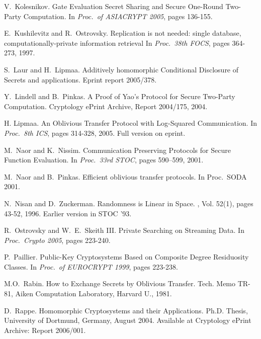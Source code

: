 \documentclass{article}
\begin{document}
\begin{footnotesize}
\begin{thebibliography}{10}
		V.~Kolesnikov.
		\newblock  Gate Evaluation Secret Sharing and Secure
		One-Round Two-Party Computation.
		\newblock In {\em Proc.\ of ASIACRYPT 2005}, pages 136-155.
		
		E.~Kushilevitz and R.~Ostrovsky.
		\newblock Replication is not needed: single database, computationally-private
		information retrieval
		\newblock In {\em Proc.\ 38th FOCS}, pages 364-273, 1997.
		
		S.~Laur and H.~Lipmaa.
		\newblock Additively homomorphic Conditional Disclosure of Secrets and applications.
		\newblock Eprint report 2005/378.
		
		Y.~Lindell and B.~Pinkas.
		\newblock A Proof of Yao's Protocol for Secure Two-Party Computation.
		\newblock Cryptology ePrint Archive, Report 2004/175, 2004.
		
		
		H. Lipmaa.
		\newblock An Oblivious Transfer Protocol with Log-Squared Communication.
		\newblock In {\em Proc.\ 8th ICS}, pages 314-328, 2005. Full
		version on eprint.
		
		 M.~Naor and K.~Nissim.
		\newblock Communication Preserving Protocols for Secure Function
		Evaluation.
		\newblock In {\em Proc.\ 33rd STOC}, pages 590--599, 2001.
		
		 M.~Naor and B.~Pinkas.
		\newblock Efficient oblivious transfer protocols.
		\newblock In {Proc.\ SODA 2001}.
		
		 N.~Nisan and D.~Zuckerman.
		\newblock Randomness is Linear in Space.
		, Vol. 52(1), pages 43-52, 1996.
		\newblock Earlier version in STOC '93.
		
		R.~Ostrovsky and W.~E.~Skeith III.
		\newblock  Private Searching on
		Streaming Data.
		\newblock In {\em Proc.\ Crypto 2005}, pages 223-240.
		
		P.~Paillier.
		\newblock  Public-Key Cryptosystems Based on Composite Degree Residuosity
		Classes.
		\newblock  In {\em Proc.\ of EUROCRYPT 1999}, pages 223-238.
		
		M.O.~Rabin.
		\newblock How to Exchange Secrets by Oblivious Transfer.
		\newblock Tech. Memo TR-81, Aiken Computation Laboratory, Harvard U., 1981.
		
		D.~Rappe.
		\newblock Homomorphic Cryptosystems and their Applications.
		\newblock Ph.D. Thesis, University of Dortmund, Germany, August 2004.
		Available at Cryptology ePrint Archive: Report 2006/001.
		

\end{thebibliography}
\end{footnotesize}
\end{document}
